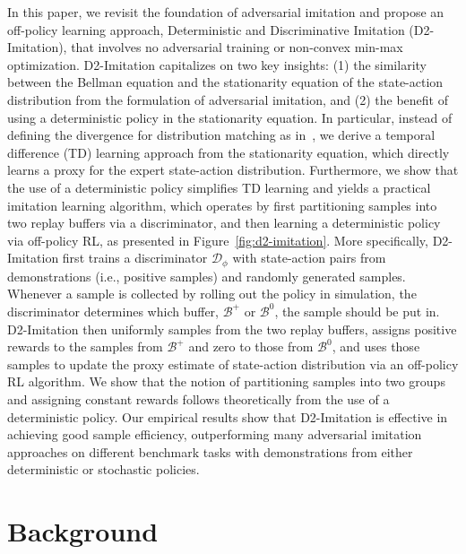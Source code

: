 \documentclass[letterpaper]{article} %
\begin{document}
In this paper, we revisit the foundation of adversarial imitation and propose an off-policy learning approach, 
Deterministic and Discriminative Imitation (D2-Imitation), that involves no adversarial training or non-convex min-max optimization. 
D2-Imitation capitalizes on two key insights: (1) 
the similarity between the Bellman equation and the stationarity equation of the state-action distribution from the formulation of adversarial imitation, 
and (2) the benefit of using a deterministic policy in the stationarity equation. 
In particular, instead of defining the divergence for distribution matching as in~\citet{ho2016generative,ghasemipour2020divergence}, 
we derive a temporal difference (TD) learning approach from the stationarity equation, which directly learns a proxy for the expert state-action distribution. 
Furthermore, we show that the use of a deterministic policy simplifies TD learning and yields a practical imitation learning algorithm, 
which operates by first partitioning samples into two replay buffers via a discriminator, 
and then learning a deterministic policy via off-policy RL, 
as presented in Figure~\ref{fig:d2-imitation}.
More specifically,  D2-Imitation first trains a discriminator $\mathcal{D}_{\phi}$ with state-action pairs from demonstrations (i.e., positive samples) and randomly generated samples. 
Whenever a sample is collected by rolling out the policy in simulation, 
the discriminator determines which buffer, $\mathcal{B}^{+}$ or $\mathcal{B}^{0}$, the sample should be put in. 
D2-Imitation then uniformly samples from the two replay buffers, assigns positive rewards to the samples from $\mathcal{B}^{+}$ and zero to those from $\mathcal{B}^{0}$, 
and uses those samples to update the proxy estimate of state-action distribution via an off-policy RL algorithm. 
We show that the notion of partitioning samples into two groups and assigning constant rewards follows theoretically from the use of a deterministic policy. 
Our empirical results show that D2-Imitation is effective in achieving good sample efficiency, outperforming many adversarial imitation approaches on different benchmark tasks with demonstrations from either deterministic or stochastic policies.

\section{Background}
\end{document}
